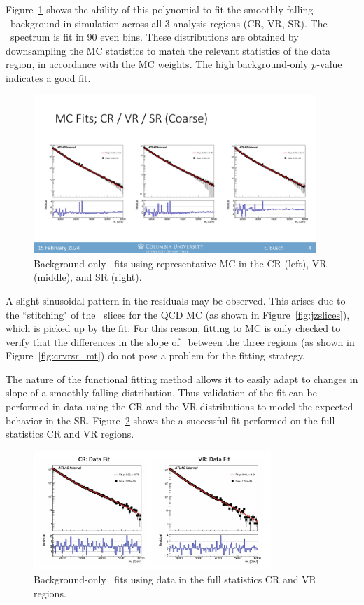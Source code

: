Figure~\ref{fig:bkgfit_mc} shows the ability of this polynomial to fit the smoothly falling \mt~background in simulation across all 3 analysis regions (CR, VR, SR).
The \mt~spectrum is fit in 90 even bins.
These distributions are obtained by downsampling the MC statistics to match the relevant statistics of the data region, in accordance with the MC weights.
The high background-only $p$-value indicates a good fit.
\begin{figure}[!htbp]
\centering
   \includegraphics[width=0.95\textwidth]{figures/stats/bkgfit_mc}
    \caption{Background-only \mt~fits using representative MC in the CR (left), VR (middle), and SR (right).
    \label{fig:bkgfit_mc}}
\end{figure}

A slight sinusoidal pattern in the residuals may be observed. 
This arises due to the ``stitching" of the \pt~slices for the QCD MC (as shown in Figure~\ref{fig:jzslices}), which is picked up by the fit.
For this reason, fitting to MC is only checked to verify that the differences in the slope of \mt~between the three regions (as shown in Figure~\ref{fig:crvrsr_mt}) do not pose a problem for the fitting strategy.

The nature of the functional fitting method allows it to easily adapt to changes in slope of a smoothly falling distribution.
Thus validation of the fit can be performed in data using the CR and the VR distributions to model the expected behavior in the SR. 
Figure~\ref{fig:bkgfit_data_fullstats} shows the a successful fit performed on the full statistics CR and VR regions.
\begin{figure}[!htbp]
\centering
   \includegraphics[width=0.8\textwidth]{figures/stats/bkgfit_data_fullstats}
    \caption{Background-only \mt~fits using data in the full statistics CR and VR regions.
    \label{fig:bkgfit_data_fullstats}}
\end{figure}

